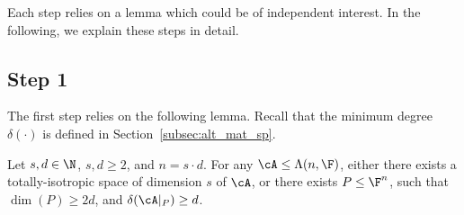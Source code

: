 Each step relies on a lemma which could be of independent interest. In the 
following, we explain these steps in detail.

\subsection{Step 1} 
%
%
The first step 
relies on the following lemma. 
Recall that the minimum degree $\delta(\cdot)$ is defined in 
Section~\ref{subsec:alt_mat_sp}.
\begin{lemma}\label{lem:iso_min-deg}
Let $s, d\in \N$, $s, d\geq 2$, and $n=s\cdot d$. For any $\cA\leq\Lambda(n, 
\F)$, either there exists a totally-isotropic space of 
dimension $s$ of $\cA$, or there exists $P\leq\F^n$, such that $\dim(P)\geq 2d$, 
and $\delta(\cA|_P)\geq 
d$. 
\end{lemma}

